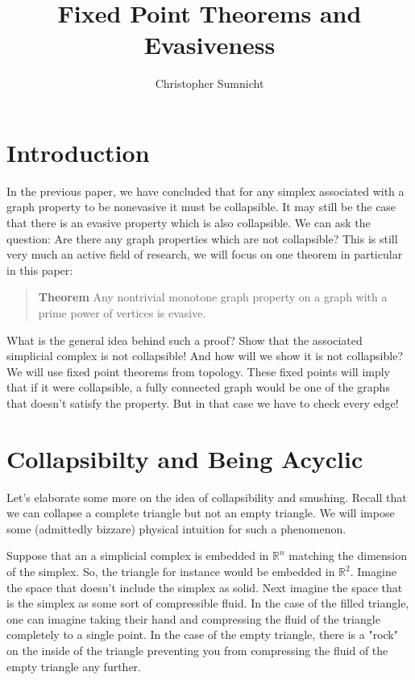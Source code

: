 \documentclass[a4paper]{article}
\begin{document}
\title{Fixed Point Theorems and Evasiveness}
\author{Christopher Sumnicht}
\maketitle

\section{Introduction}

In the previous paper, we have concluded that for any simplex associated with a graph property to be nonevasive it must be collapsible. It may still be the case that there is an evasive property which is also collapsible. We can ask the question: Are there any graph properties which are not collapsible? This is still very much an active field of research, we will focus on one theorem in particular in this paper:

\begin{quote}
    \textbf{Theorem} Any nontrivial monotone graph property on a graph with a prime power of vertices is evasive. \cite{orig}
\end{quote}

What is the general idea behind such a proof? Show that the associated simplicial complex is not collapsible! And how will we show it is not collapsible? We will use fixed point theorems from topology. These fixed points will imply that if it were collapsible, a fully connected graph would be one of the graphs that doesn't satisfy the property. But in that case we have to check every edge!

\section{Collapsibilty and Being Acyclic}

Let's elaborate some more on the idea of collapsibility and smushing. Recall that we can collapse a complete triangle but not an empty triangle. We will impose some (admittedly bizzare) physical intuition for such a phenomenon.

Suppose that an a simplicial complex is embedded in $\mathbb{R}^n$ matching the dimension of the simplex. So, the triangle for instance would be embedded in $\mathbb{R}^2$. Imagine the space that doesn't include the simplex as solid. Next imagine the space that is the simplex as some sort of compressible fluid. In the case of the filled triangle, one can imagine taking their hand and compressing the fluid of the triangle completely to a single point. In the case of the empty triangle, there is a "rock" on the inside of the triangle preventing you from compressing the fluid of the empty triangle any further.
\end{document}
